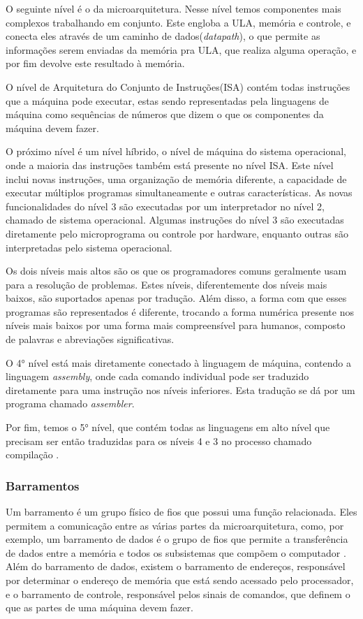 \documentclass[
	12pt,				%
	openright,			%
	oneside,			%
	a4paper,			%
	english,			%
	french,				%
	spanish,			%
	brazil,				%
	]{abntex2}
\begin{document}
O seguinte nível é o da microarquitetura.  Nesse nível temos componentes mais complexos trabalhando em conjunto. Este engloba a ULA, memória e controle, e conecta eles através de um caminho de dados(\textit{datapath}), o que permite as informações serem enviadas da memória pra ULA, que realiza alguma operação, e por fim devolve este resultado à memória.

O nível de Arquitetura do Conjunto de Instruções(ISA) contém todas instruções que a máquina pode executar, estas sendo representadas pela linguagens de máquina como sequências de números que dizem o que os componentes da máquina devem fazer.

O próximo nível é um nível híbrido, o nível de máquina do sistema operacional, onde a maioria das instruções também está presente no nível ISA. Este nível inclui novas instruções, uma organização de memória diferente, a capacidade de executar múltiplos programas simultaneamente e outras características.  As novas funcionalidades do nível 3 são executadas por um interpretador no nível 2, chamado de sistema operacional. Algumas instruções do nível 3 são executadas diretamente pelo microprograma ou controle por hardware, enquanto outras são interpretadas pelo sistema operacional.

Os dois níveis mais altos são os que os programadores comuns geralmente usam para a resolução de problemas. Estes níveis, diferentemente dos níveis mais baixos, são suportados apenas por tradução.  Além disso, a forma com que esses programas são representados é diferente, trocando a forma numérica presente nos níveis mais baixos por uma forma mais compreensível para humanos, composto de palavras e abreviações significativas.

O 4° nível está mais diretamente conectado à linguagem de máquina, contendo a linguagem \textit{assembly}, onde cada comando individual pode ser traduzido diretamente para uma instrução nos níveis inferiores. Esta tradução se dá por um programa chamado \textit{assembler}.

Por fim, temos o 5° nível, que contém todas as linguagens em alto nível que precisam ser então traduzidas para os níveis 4 e 3 no processo chamado compilação \cite[p.5-8]{tanenbaum_structured_2013}.

\subsubsection{Barramentos}
Um barramento é um grupo físico de fios que possui uma função relacionada. Eles permitem a comunicação entre as várias partes da microarquitetura, como, por exemplo, um barramento de dados é o grupo de fios que permite a transferência de dados entre a memória e todos os subsistemas que compõem o computador \cite[p.11-12]{catsoulis_designing_2002}.
Além do barramento de dados, existem o barramento de endereços, responsável por determinar o endereço de memória que está sendo acessado pelo processador, e o barramento de controle, responsável pelos sinais de comandos, que definem o que as partes de uma máquina devem fazer.
\end{document}
